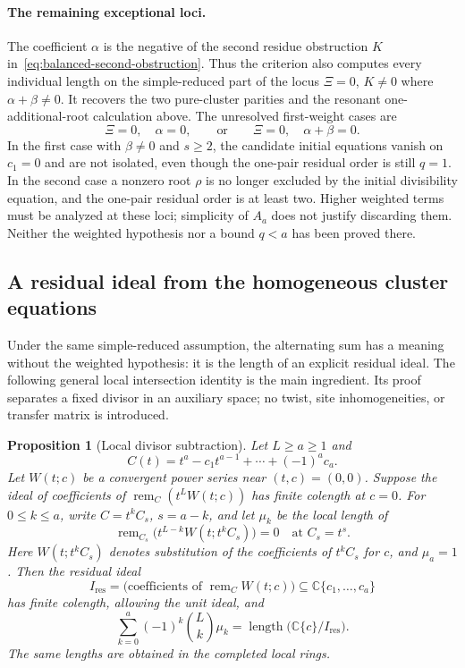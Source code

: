 \documentclass[11pt]{article}
\newtheorem{proposition}{Proposition}[section]
\theoremstyle{definition}
\newcommand{\C}{\mathbb C}
\newcommand{\length}{\operatorname{length}}
\begin{document}
\paragraph{The remaining exceptional loci.}
The coefficient $\alpha$ is the negative of the second residue
obstruction $K$ in~\eqref{eq:balanced-second-obstruction}.
Thus the criterion also computes every individual length on the
simple-reduced part of the locus $\Xi=0$, $K\ne0$ where
$\alpha+\beta\ne0$. It recovers the two pure-cluster parities and
the resonant one-additional-root calculation above.
The unresolved first-weight cases are
\[
 \Xi=0,\quad\alpha=0,
 \qquad\text{or}\qquad
 \Xi=0,\quad\alpha+\beta=0.
\]
In the first case with $\beta\ne0$ and $s\ge2$, the candidate initial
equations vanish on $c_1=0$ and are not isolated, even though the
one-pair residual order is still $q=1$. In the second case a nonzero
root $\rho$ is no longer excluded by the initial divisibility equation,
and the one-pair residual order is at least two. Higher weighted terms
must be analyzed at these loci; simplicity of $A_a$ does not justify
discarding them. Neither the weighted hypothesis nor a bound $q<a$
has been proved there.

\subsection{A residual ideal from the homogeneous cluster equations}
\label{sec:direct-residual-ideal}

Under the same simple-reduced assumption, the alternating sum has a
meaning without the weighted hypothesis: it is the length of an
explicit residual ideal. The following general local intersection
identity is the main ingredient. Its proof separates a fixed divisor
in an auxiliary space; no twist, site inhomogeneities, or transfer
matrix is introduced.

\begin{proposition}[Local divisor subtraction]
\label{prop:local-divisor-subtraction}
Let $L\ge a\ge1$ and
\[
 C(t)=t^a-c_1t^{a-1}+\cdots+(-1)^ac_a.
\]
Let $W(t;c)$ be a convergent power series near $(t,c)=(0,0)$.
Suppose the ideal of coefficients of
$\operatorname{rem}_C(t^LW(t;c))$ has finite colength at $c=0$.
For $0\le k\le a$, write $C=t^kC_s$, $s=a-k$, and let $\mu_k$
be the local length of
\[
 \operatorname{rem}_{C_s}
 \bigl(t^{L-k}W(t;t^kC_s)\bigr)=0
 \quad\text{at }C_s=t^s.
\]
Here $W(t;t^kC_s)$ denotes substitution of the coefficients of $t^kC_s$
for $c$, and $\mu_a=1$. Then the residual ideal
\[
 I_{\mathrm{res}}=
 \bigl(\text{coefficients of }\operatorname{rem}_C W(t;c)\bigr)
 \subseteq\C\{c_1,\ldots,c_a\}
\]
has finite colength, allowing the unit ideal, and
\begin{equation}\label{eq:local-divisor-subtraction}
 \boxed{\sum_{k=0}^a(-1)^k\binom Lk\mu_k
        =\length\bigl(\C\{c\}/I_{\mathrm{res}}\bigr).}
\end{equation}
The same lengths are obtained in the completed local rings.
\end{proposition}
\end{document}
